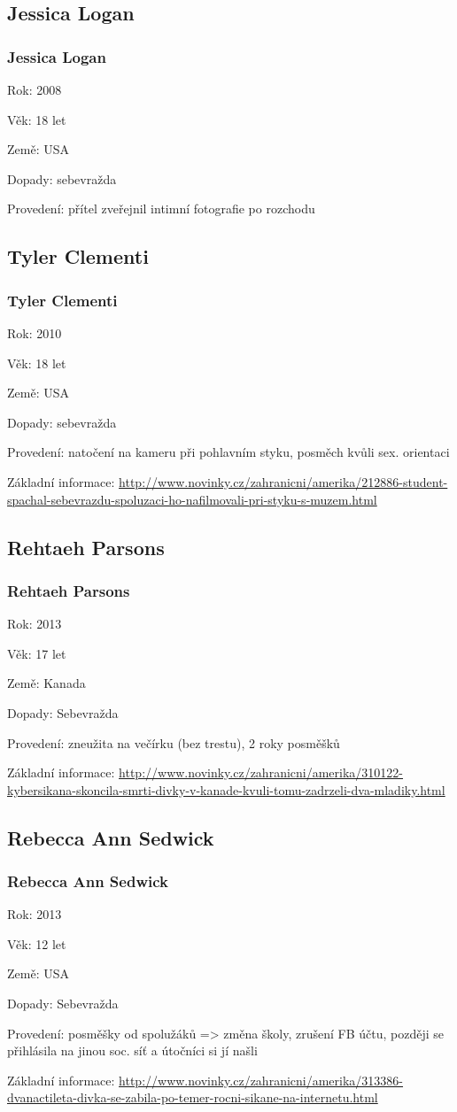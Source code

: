 \documentclass[xetex]{beamer}
\begin{document}
\subsection{Jessica Logan}
\begin{frame}
	\frametitle{Jessica Logan}

	Rok: 2008

	Věk: 18 let

	Země: USA

	Dopady: sebevražda

	Provedení: přítel zveřejnil intimní fotografie po rozchodu
\end{frame}

\subsection{Tyler Clementi}
\begin{frame}
	\frametitle{Tyler Clementi}
	Rok: 2010

	Věk: 18 let

	Země: USA
	
	Dopady: sebevražda

	Provedení: natočení na kameru při pohlavním styku, posměch kvůli sex. orientaci
	
	Základní informace: \scriptsize{\url{http://www.novinky.cz/zahranicni/amerika/212886-student-spachal-sebevrazdu-spoluzaci-ho-nafilmovali-pri-styku-s-muzem.html}}
\end{frame}

\subsection{Rehtaeh Parsons}
\begin{frame}
	\frametitle{Rehtaeh Parsons}
	Rok: 2013
	
	Věk: 17 let
	
	Země: Kanada
	
	Dopady: Sebevražda
	
	Provedení: zneužita na večírku (bez trestu), 2 roky posměšků
	
	Základní informace: \scriptsize{\url{http://www.novinky.cz/zahranicni/amerika/310122-kybersikana-skoncila-smrti-divky-v-kanade-kvuli-tomu-zadrzeli-dva-mladiky.html}}
\end{frame}

\subsection{Rebecca Ann Sedwick}
\begin{frame}
	\frametitle{Rebecca Ann Sedwick}
	Rok: 2013
	
	Věk: 12 let
	
	Země: USA
	
	Dopady: Sebevražda
	
	Provedení: posměšky od spolužáků => změna školy, zrušení FB účtu, později se přihlásila na jinou soc. síť a útočníci si jí našli
	
	Základní informace: \scriptsize{\url{http://www.novinky.cz/zahranicni/amerika/313386-dvanactileta-divka-se-zabila-po-temer-rocni-sikane-na-internetu.html}}
\end{frame}
\end{document}
